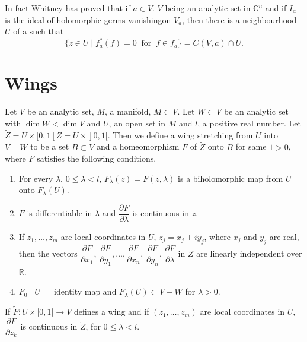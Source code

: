 \begin{remark} %
  In fact Whitney \cite{key6} has proved that if $a \in V$. $V$ being an
  analytic set in  $\mathbb{C}^n$ and  if  $I_{a}$ is the ideal
  of holomorphic germs vanishing\pageoriginale on $V_{a}$, then there is a
  neighbourhood $U$ of a such that 
  $$ 
  \bigg\{z \in U \mid
  f^{\ast}_{a}(f) = 0  ~\text{ for }~ f \in f_{a}\bigg\}= C(V,a) \cap U.
  $$  
\end{remark}

\section{Wings}\label{chap3-sec2}

\begin{definition}\label{chap3-defin8} %
  Let $V$ be an analytic set, $M$, a manifold, $M \subset V$. Let 
  $W\subset V$ be an analytic set with $\dim  W < \dim V$ and $U$, an open
  set in $M$ and $l$, a positive real number. Let $\widetilde{Z} =
  U \times [0,1[Z = U \times]0,1[$. Then we define a wing
      stretching from $U$ into $V-W$ to be a set $B \subset V$ and a
      homeomorphism $F$ of $\widetilde{Z}$ onto $B$ for same $1>
      0$, where $F$ satisfies the following conditions. 
\begin{enumerate}[(1)]
\item For every $\lambda$, $0 \leq \lambda < l$, $F_{\lambda} (z) = F(z,
  \lambda)$ is a biholomorphic map from $U$ onto $ F_{\lambda}(U)$. 

\item $F$ is differentiable in $\lambda$ and $\dfrac{\partial
  F}{\partial \lambda}$ is continuous in $z$. 

\item If $z_{1}, \ldots , z_{m}$ are local coordinates in $U$, $z_{j}
  = x_{j} + iy_{j}$, where $x_{j}$ and $y_{j}$ are real, then the
  vectors $\dfrac{\partial F}{\partial x_{1}}$, $\dfrac{\partial
    F}{\partial y_{1}},\ldots, \dfrac{\partial F}{\partial
    x_{n}}$, $\dfrac{\partial F}{\partial y_{n}}$, $\dfrac{\partial
    F}{\partial \lambda}$ in $Z$ are linearly independent over
  $\mathbb{R}$. 

\item $F_{0} \mid U =$ identity map and $F_{\lambda}(U) \subset
  V - W$ for $\lambda >0$. 
\end{enumerate}
\end{definition}

\begin{remark}\label{chap3-rem6} %
  If $\widetilde{F} : U \times [0,1[\to V$ defines a wing
      and if $(z_{1}, \ldots , z_{m})$ are local coordinates in $U$,
      $\dfrac{\partial F}{\partial z_{k}}$ is continuous in
      $\widetilde{Z}$, for $0 \leq \lambda < l$. 
\end{remark}

